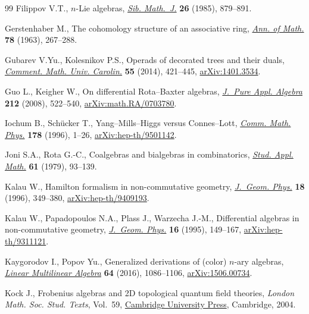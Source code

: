 \begin{thebibliography}{99}
Filippov V.T., {$n$}-{L}ie algebras, \href{https://doi.org/10.1007/BF00969110}{\textit{Sib. Math.~J.}} \textbf{26} (1985),
 879--891.

Gerstenhaber M., The cohomology structure of an associative ring, \href{https://doi.org/10.2307/1970343}{\textit{Ann.
 of Math.}} \textbf{78} (1963), 267--288.

Gubarev V.Yu., Kolesnikov P.S., Operads of decorated trees and their duals,
 \href{https://doi.org/10.1215/00294527-2798700}{\textit{Comment. Math. Univ. Carolin.}} \textbf{55} (2014), 421--445,
 \href{https://arxiv.org/abs/1401.3534}{arXiv:1401.3534}.

Guo L., Keigher W., On differential {R}ota--{B}axter algebras, \href{https://doi.org/10.1016/j.jpaa.2007.06.008}{\textit{J.~Pure
 Appl. Algebra}} \textbf{212} (2008), 522--540, \href{https://arxiv.org/abs/math.RA/0703780}{arXiv:math.RA/0703780}.

Iochum B., Sch\"ucker T., Yang--{M}ills--{H}iggs versus {C}onnes--{L}ott,
 \href{https://doi.org/10.1007/BF02104906}{\textit{Comm. Math. Phys.}} \textbf{178} (1996), 1--26,
 \href{https://arxiv.org/abs/hep-th/9501142}{arXiv:hep-th/9501142}.

Joni S.A., Rota G.-C., Coalgebras and bialgebras in combinatorics, \href{https://doi.org/10.1002/sapm197961293}{\textit{Stud.
 Appl. Math.}} \textbf{61} (1979), 93--139.

Kalau W., Hamilton formalism in non-commutative geometry, \href{https://doi.org/10.1016/0393-0440(95)00015-1}{\textit{J.~Geom.
 Phys.}} \textbf{18} (1996), 349--380, \href{https://arxiv.org/abs/hep-th/9409193}{arXiv:hep-th/9409193}.

Kalau W., Papadopoulos N.A., Plass J., Warzecha J.-M., Differential algebras in
 non-commutative geometry, \href{https://doi.org/10.1016/0393-0440(94)00025-Y}{\textit{J.~Geom. Phys.}} \textbf{16} (1995),
 149--167, \href{https://arxiv.org/abs/hep-th/9311121}{arXiv:hep-th/9311121}.

Kaygorodov I., Popov Yu., Generalized derivations of (color) {$n$}-ary algebras,
 \href{https://doi.org/10.1080/03081087.2015.1072492}{\textit{Linear Multilinear Algebra}} \textbf{64} (2016), 1086--1106,
 \href{https://arxiv.org/abs/1506.00734}{arXiv:1506.00734}.

Kock J., Frobenius algebras and 2{D} topological quantum field theories,
 \textit{London Math. Soc. Stud. Texts}, Vol.~59, \href{https://doi.org/10.1017/CBO9780511615443}{Cambridge University Press},
 Cambridge, 2004.


\end{thebibliography}
